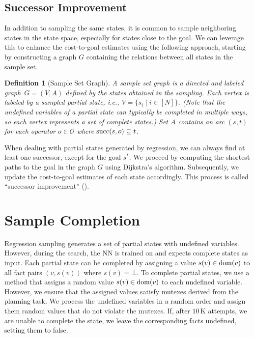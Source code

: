 \documentclass[ppgc,diss,english]{iiufrgs}
\newtheorem{definition}{Definition}
\begin{document}
\subsection{Successor Improvement}
\label{sec:sample-sui}
In addition to sampling the same states, it is common to sample neighboring states in the state space, especially for states close to the goal. We can leverage this to enhance the cost-to-goal estimates using the following approach, starting by constructing a graph $G$ containing the relations between all states in the sample set.
%
\begin{definition}[Sample Set Graph]\label{def:graph}
A sample set graph is a directed and labeled graph~$G = (V, A)$ defined by the states obtained in the sampling. Each vertex is labeled by a sampled partial state, i.e., $V = \{s_i \mid i \in [N]\}$. (Note that the undefined variables of a partial state can typically be completed in multiple ways, so each vertex represents a set of complete states.) Set $A$ contains an arc $(s,t)$ for each operator $o \in \mathcal{O}$ where $\operatorname{succ}(s,o) \subseteq t$.
\end{definition}

When dealing with partial states generated by regression, we can always find at least one successor, except for the goal $s^{*}$. We proceed by computing the shortest paths to the goal in the graph $G$ using Dijkstra's algorithm. Subsequently, we update the cost-to-goal estimates of each state accordingly. This process is called ``successor improvement'' (\sui).


\section{Sample Completion}
\label{sec:sample-completion}

Regression sampling generates a set of partial states with undefined variables. However, during the search, the NN is trained on and expects complete states as input.
Each partial state can be completed by assigning a value $s(v)\in\operatorname{dom}(v)$ to all fact pairs $(v,s(v))$ where $s(v)=\bot$.
To complete partial states, we use a method that assigns a random value $s(v) \in \operatorname{dom}(v)$ to each undefined variable. However, we ensure that the assigned values satisfy mutexes derived from the planning task. We process the undefined variables in a random order and assign them random values that do not violate the mutexes. If, after $10$\,K attempts, we are unable to complete the state, we leave the corresponding facts undefined, setting them to false.%
\end{document}
